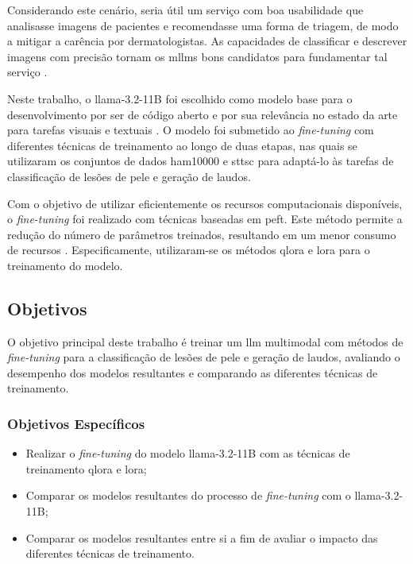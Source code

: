 Considerando este cenário, seria útil um serviço com boa usabilidade que analisasse imagens de pacientes e recomendasse
uma forma de triagem, de modo a mitigar a carência por dermatologistas. As capacidades de classificar e descrever
imagens com precisão tornam os \acp{mllm} bons candidatos para fundamentar tal serviço \cite{mllm_success_rate}.

Neste trabalho, o \ac{llama}-3.2-11B foi escolhido como modelo base para o desenvolvimento por ser de código aberto e
por sua relevância no estado da arte para tarefas visuais e textuais \cite{dubey2024llama}. O modelo foi submetido ao
\textit{fine-tuning} com diferentes técnicas de treinamento ao longo de duas etapas, nas quais se utilizaram os
conjuntos de dados \ac{ham10000} e \ac{sttsc} para adaptá-lo às tarefas de classificação de lesões de pele e geração
de laudos.

Com o objetivo de utilizar eficientemente os recursos computacionais disponíveis, o \textit{fine-tuning} foi realizado
com técnicas baseadas em \ac{peft}. Este método permite a redução do número de parâmetros treinados, resultando em um
menor consumo de recursos \cite{peft}. Especificamente, utilizaram-se os métodos \ac{qlora} e \ac{lora} para o
treinamento do modelo.

\subsection{Objetivos}

O objetivo principal deste trabalho é treinar um \ac{llm} multimodal com métodos de \textit{fine-tuning} para a
classificação de lesões de pele e geração de laudos, avaliando o desempenho dos modelos resultantes e comparando as
diferentes técnicas de treinamento.

\subsubsection*{Objetivos Específicos}

\begin{itemize}
    \item Realizar o \textit{fine-tuning} do modelo \ac{llama}-3.2-11B com as técnicas de treinamento \ac{qlora} e
          \ac{lora};
    \item Comparar os modelos resultantes do processo de \textit{fine-tuning} com o \ac{llama}-3.2-11B;
    \item Comparar os modelos resultantes entre si a fim de avaliar o impacto das diferentes técnicas de treinamento.
\end{itemize}
